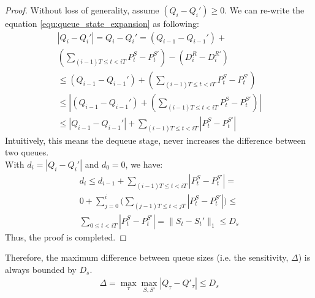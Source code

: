 \begin{proof}
Without loss of generality, assume $(Q_{i}-Q_{i}') \geq 0$.
We can re-write the equation \ref*{equ:queue_state_expansion} as following:
\begin{align*}
        \nonumber
        |Q_{i} - Q_{i}'|
        =
        Q_{i} - Q_{i}'
        =
         (Q_{i-1} - Q_{i-1}')
        +
        \\
        (\sum_{(i - 1)T \leq t < iT}P^S_t - P^{S'}_t)
        -
        (D^{R}_{i} - D^{R'}_{i})
        \\
        \leq
        (Q_{i-1} - Q_{i-1}')
        +
        (\sum_{(i - 1)T \leq t < iT}P^S_t - P^{S'}_t)
        \\
        \leq
        |
        (Q_{i-1} - Q_{i-1}')
        +
        (\sum_{(i - 1)T \leq t < iT}P^S_t - P^{S'}_t)
        |
        \\
        \leq
        |Q_{i-1} - Q_{i-1}'|
        +
        \sum_{(i - 1)T \leq t < iT}|P^S_t - P^{S'}_t|
\end{align*}
Intuitively, this means the dequeue stage, never increases the difference
between two queues.
\\
With $d_i = |Q_{i}-Q_{i}'|$ and $d_0 = 0$, we have:
\begin{align}
        \nonumber
        d_i
        \leq
        d_{i-1}
        +
        \sum_{(i - 1)T \leq t < iT}|P^S_t - P^{S'}_t|
        =
        \\ \nonumber
        0 + \sum_{j=0}^{i}\big({\sum_{(j - 1)T \leq t < jT}|P^S_t - P^{S'}_t|}\big)
        \leq
        \\
        \sum_{0 \leq t < iT} |P^S_t - P^{S'}_t|
        =
        \|S_t - S_t'\|_1
        \leq
        D_s
\end{align}
Thus, the proof is completed.
\end{proof}
Therefore, the maximum difference between queue sizes (i.e. the sensitivity, $\Delta$) is always bounded by $D_s$.
\begin{align}
  \Delta = \max_{\tau}\max_{S, S'} | Q_{\tau} - Q'_{\tau} | \leq D_s
\end{align}
